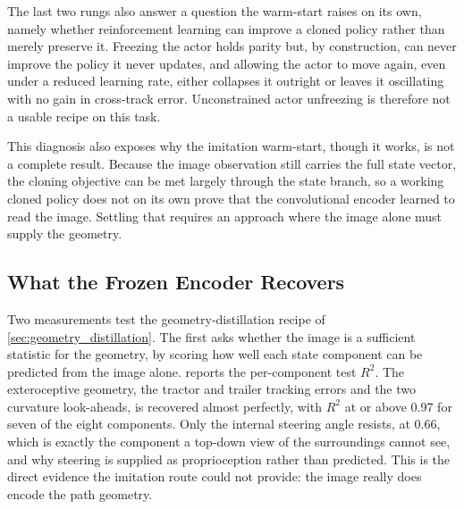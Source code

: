 The last two rungs also answer a question the warm-start raises on its own, namely whether reinforcement learning can improve a cloned policy rather than merely preserve it. Freezing the actor holds parity but, by construction, can never improve the policy it never updates, and allowing the actor to move again, even under a reduced learning rate, either collapses it outright or leaves it oscillating with no gain in cross-track error. Unconstrained actor unfreezing is therefore not a usable recipe on this task.

This diagnosis also exposes why the imitation warm-start, though it works, is not a complete result. Because the image observation still carries the full state vector, the cloning objective can be met largely through the state branch, so a working cloned policy does not on its own prove that the convolutional encoder learned to read the image. Settling that requires an approach where the image alone must supply the geometry.

\subsection{What the Frozen Encoder Recovers}
\label{sec:geometry_encoder}

Two measurements test the geometry-distillation recipe of \cref{sec:geometry_distillation}. The first asks whether the image is a sufficient statistic for the geometry, by scoring how well each state component can be predicted from the image alone.  reports the per-component test $R^2$. The exteroceptive geometry, the tractor and trailer tracking errors and the two curvature look-aheads, is recovered almost perfectly, with $R^2$ at or above 0.97 for seven of the eight components. Only the internal steering angle resists, at 0.66, which is exactly the component a top-down view of the surroundings cannot see, and why steering is supplied as proprioception rather than predicted. This is the direct evidence the imitation route could not provide: the image really does encode the path geometry.



